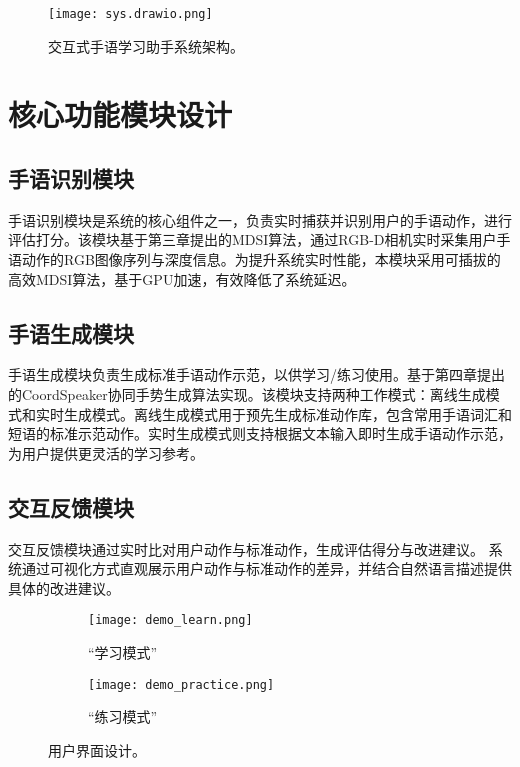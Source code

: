 \begin{figure}
    \centering
    \texttt{[image: sys.drawio.png]}
    \caption{交互式手语学习助手系统架构。}
    \label{fig:system_arch}
  \end{figure}

\section{核心功能模块设计}

\subsection{手语识别模块}
手语识别模块是系统的核心组件之一，负责实时捕获并识别用户的手语动作，进行评估打分。该模块基于第三章提出的MDSI算法，通过RGB-D相机实时采集用户手语动作的RGB图像序列与深度信息。为提升系统实时性能，本模块采用可插拔的高效MDSI算法，基于GPU加速，有效降低了系统延迟。

\subsection{手语生成模块}
手语生成模块负责生成标准手语动作示范，以供学习/练习使用。基于第四章提出的CoordSpeaker协同手势生成算法实现。该模块支持两种工作模式：离线生成模式和实时生成模式。离线生成模式用于预先生成标准动作库，包含常用手语词汇和短语的标准示范动作。实时生成模式则支持根据文本输入即时生成手语动作示范，为用户提供更灵活的学习参考。

\subsection{交互反馈模块}
交互反馈模块通过实时比对用户动作与标准动作，生成评估得分与改进建议。%
系统通过可视化方式直观展示用户动作与标准动作的差异，并结合自然语言描述提供具体的改进建议。%


\begin{figure}
    \centering
    \begin{subfigure}[b]{0.7\linewidth}
        \centering
        \texttt{[image: demo\_learn.png]}
        \caption{“学习模式”}
    \end{subfigure}
    \hfill
    \begin{subfigure}[b]{0.7\linewidth}
        \centering
        \texttt{[image: demo\_practice.png]}
        \caption{“练习模式”}
    \end{subfigure}
    \caption{用户界面设计。}
    \label{fig:ui_design}
\end{figure}
  

